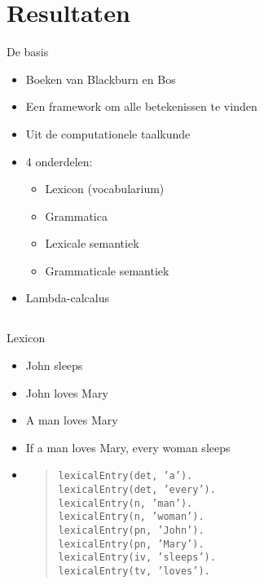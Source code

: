 \documentclass[notes, dvipsnames]{beamer}
\newcommand{\seperation}{
	\vspace{1em}
	\ppause
}
\newcommand{\hitem}{
	\ppause
	\item
}
\newcommand{\ppause}{\onslide<+>}
\begin{document}
  \section{Resultaten}
	\begin{frame}{De basis}
		\begin{itemize}
			\hitem Boeken van Blackburn en Bos \cite{BlackburnBosBook1, BlackburnBosBook2} 
      \item Een framework om alle betekenissen te vinden
      \item Uit de computationele taalkunde
			
			\seperation
      \item 4 onderdelen:
        \begin{itemize}
          \item Lexicon (vocabularium)
          \item Grammatica
          \item Lexicale semantiek
          \item Grammaticale semantiek
        \end{itemize}
      \item Lambda-calcalus
		\end{itemize}
	\end{frame}

  \subsection{}
	\begin{frame}{Lexicon}
		\begin{itemize}
      \hitem John sleeps
			\item John loves Mary
      \item A man loves Mary
      \item If a man loves Mary, every woman sleeps
      \hitem
        \begin{quote}
          \texttt{lexicalEntry(det, 'a').} \\
          \texttt{lexicalEntry(det, 'every').} \\
          \texttt{lexicalEntry(n, 'man').} \\
          \texttt{lexicalEntry(n, 'woman').} \\
          \texttt{lexicalEntry(pn, 'John').} \\
          \texttt{lexicalEntry(pn, 'Mary').} \\
          \texttt{lexicalEntry(iv, 'sleeps').} \\
          \texttt{lexicalEntry(tv, 'loves').} \\
        \end{quote}
		\end{itemize}
	\end{frame}
\end{document}
